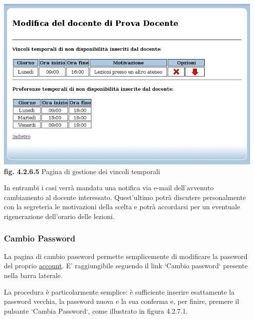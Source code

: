 \documentclass[11pt,a4paper]{article}
\begin{document}
\bigskip
\begin{center}
	\includegraphics[scale=0.5]{images/gestione_vincoli_docenti.jpg}\\
	\textbf{fig. 4.2.6.5} Pagina di gestione dei vincoli temporali\\
\end{center}
\bigskip

In entrambi i casi verrà mandata una notifica via e-mail dell'avvenuto cambiamento al docente interessato. Quest'ultimo potrà discutere personalmente con la segreteria le motivazioni della scelta e potrà accordarsi per un eventuale rigenerazione dell'orario delle lezioni.
\subsubsection{Cambio Password}
La pagina di cambio password permette semplicemente di modificare la password del proprio \underline{account}. E' raggiungibile seguendo il link `Cambio password` presente nella barra laterale.

La procedura è particolarmente semplice: è sufficiente inserire esattamente la password vecchia, la password nuova e la sua conferma e, per finire, premere il pulsante `Cambia Password`, come illustrato in figura 4.2.7.1.
\end{document}
